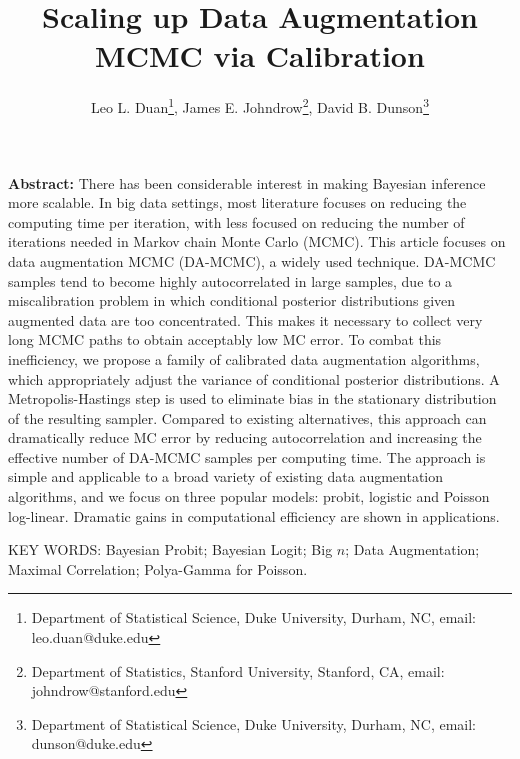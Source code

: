 \documentclass[12pt]{article}
\begin{document}
\title{{Scaling up Data Augmentation MCMC via Calibration}}



\author{ Leo L. Duan\thanks{Department of Statistical Science, Duke University, Durham, NC, email: leo.duan@duke.edu},
     James E. Johndrow\thanks{Department of Statistics, Stanford University, Stanford, CA, email: johndrow@stanford.edu},
     David B. Dunson\thanks{Department of Statistical Science, Duke University, Durham, NC, email: dunson@duke.edu}
     }

\date{}

\maketitle


{\bf Abstract:} 
{There has been considerable interest in making Bayesian inference more scalable.}
{In big data settings},  most literature focuses on reducing the computing
time per iteration, with less focused on reducing the number of iterations
needed in Markov chain Monte Carlo (MCMC). This article focuses on data
augmentation MCMC (DA-MCMC), a widely used technique. {DA-MCMC samples tend
to become highly autocorrelated in large samples, due to a miscalibration problem in which conditional posterior distributions given augmented data are too concentrated.  This makes it necessary to collect very long MCMC
paths to obtain acceptably low MC error.} {To combat this inefficiency, we propose a family of calibrated data augmentation algorithms, which appropriately adjust the variance of conditional posterior distributions. A Metropolis-Hastings step is used to eliminate bias in the stationary distribution of the resulting sampler}. {Compared to existing alternatives, this approach} {can dramatically reduce MC error by reducing autocorrelation and increasing the effective number of DA-MCMC samples per computing time.} The approach is {simple and}  applicable to a broad variety of existing data augmentation algorithms, and we focus on three popular models: probit, logistic and Poisson log-linear.  Dramatic gains in computational efficiency are shown in applications.
\vskip 12pt 

{\noindent  KEY WORDS:   Bayesian Probit; Bayesian Logit; Big $n$; Data Augmentation; Maximal Correlation; Polya-Gamma for Poisson.}
\end{document}
